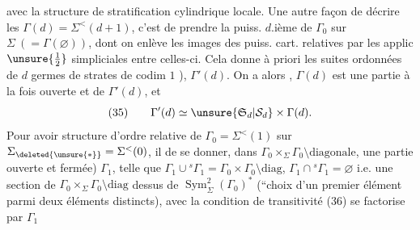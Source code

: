 avec la structure de stratification cylindrique 
locale.  Une autre façon de
décrire les $\Gamma(d)=\Sigma^{<}(d+1)$, c'est de
prendre la puiss.   $d$.ième de $\Gamma_0$\deleted{\unsure{$(\varnothing)$}}
sur $\Sigma\ (=\Gamma(\varnothing))$, dont on enlève les images
des puiss. cart. relatives   par les applic
$\unsure{\tfrac12}$ simpliciales entre celles-ci. Cela donne à priori
les  suites ordonnées de $d$ germes de
strates de codim $1$   ), 
$\Gamma'(d)$. On a alors ,
$\Gamma(d)$ est une partie à la fois ouverte et
 de $\Gamma'(d)$, et 
\[
(35)\qquad \Gamma'(d)\simeq\unsure{\mathfrak S_d|\mathcal S_d}\times\Gamma(d).
\]
Pour avoir  structure d'ordre  relative de
 $\Gamma_0=\Sigma^{<}(1)$ sur $\Sigma_{\deleted{\unsure{*}}}=\Sigma^{<}(0)$, il 
de se donner,  dans
$\Gamma_0\times_\Sigma\Gamma_0\setminus\text{diagonale}$, une partie  ouverte et fermée)
$\Gamma_1$, telle que $\Gamma_1\cup{}^s\Gamma_1=\Gamma_0\times\Gamma_0\setminus\text{diag}$, $\Gamma_1\cap{}^s\Gamma_1=\varnothing$
i.e. une section de $\Gamma_0\times_\Sigma\Gamma_0\setminus\text{diag}$  dessus
de $\operatorname{Sym}^2_\Sigma(\Gamma_0)^*$ (``choix d'un premier élément parmi deux
éléments distincts), avec la condition de transitivité
(36) \quad se factorise par $\Gamma_1$
